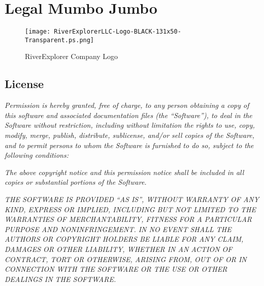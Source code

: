 \section{Legal Mumbo Jumbo}

  \begin{figure}
    \centering
    \texttt{[image: RiverExplorerLLC-Logo-BLACK-131x50-Transparent.ps.png]}
    \caption{RiverExplorer Company Logo}
    \label{fig:RiverExplorerLogo}
  \end{figure}
  
\subsection{License}
\textit{Permission is hereby granted, free of charge, to any person obtaining a copy of this software and associated documentation files (the “Software”), to deal in the Software without restriction, including without limitation the rights to use, copy, modify, merge, publish, distribute, sublicense, and/or sell copies of the Software, and to permit persons to whom the Software is furnished to do so, subject to the following conditions:}

\textit{The above copyright notice and this permission notice shall be included in all copies or substantial portions of the Software.}

\textit{THE SOFTWARE IS PROVIDED “AS IS”, WITHOUT WARRANTY OF ANY KIND, EXPRESS OR IMPLIED, INCLUDING BUT NOT LIMITED TO THE WARRANTIES OF MERCHANTABILITY, FITNESS FOR A PARTICULAR PURPOSE AND NONINFRINGEMENT. IN NO EVENT SHALL THE AUTHORS OR COPYRIGHT HOLDERS BE LIABLE FOR ANY CLAIM, DAMAGES OR OTHER LIABILITY, WHETHER IN AN ACTION OF CONTRACT, TORT OR OTHERWISE, ARISING FROM, OUT OF OR IN CONNECTION WITH THE SOFTWARE OR THE USE OR OTHER DEALINGS IN THE SOFTWARE.}
